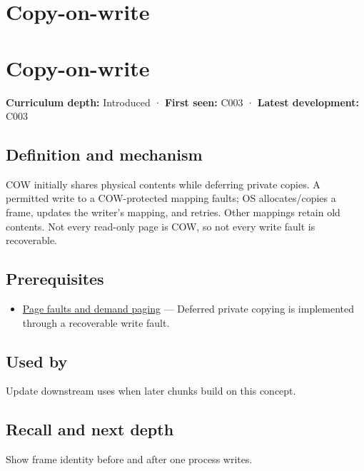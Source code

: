 \hypertarget{appendix-7a06e5baac04}{}
\section*{Copy-on-write}
\section{Copy-on-write}\label{appendix-7a06e5baac04-copy-on-write}

\textbf{Curriculum depth:} Introduced · \textbf{First seen:} C003 · \textbf{Latest development:} C003

\subsection{Definition and mechanism}\label{appendix-7a06e5baac04-definition-and-mechanism}

COW initially shares physical contents while deferring private copies. A permitted write to a COW-protected mapping faults; OS allocates/copies a frame, updates the writer's mapping, and retries. Other mappings retain old contents. Not every read-only page is COW, so not every write fault is recoverable.

\subsection{Prerequisites}\label{appendix-7a06e5baac04-prerequisites}

\begin{itemize}
\tightlist
\item
  \hyperref[appendix-cc0909a7ef14]{Page faults and demand paging} --- Deferred private copying is implemented through a recoverable write fault.
\end{itemize}

\subsection{Used by}\label{appendix-7a06e5baac04-used-by}

Update downstream uses when later chunks build on this concept.

\subsection{Recall and next depth}\label{appendix-7a06e5baac04-recall-and-next-depth}

Show frame identity before and after one process writes.

